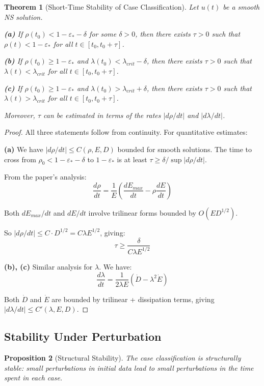 \documentclass[11pt]{article}
\newtheorem{theorem}{Theorem}
\newtheorem{proposition}[theorem]{Proposition}
\theoremstyle{definition}
\begin{document}
\begin{theorem}[Short-Time Stability of Case Classification]\label{thm:short-time}
Let $u(t)$ be a smooth NS solution.

\textbf{(a)} If $\rho(t_0) < 1 - \varepsilon_* - \delta$ for some $\delta > 0$, then there exists $\tau > 0$ such that $\rho(t) < 1 - \varepsilon_*$ for all $t \in [t_0, t_0 + \tau]$.

\textbf{(b)} If $\rho(t_0) \geq 1 - \varepsilon_*$ and $\lambda(t_0) < \lambda_{crit} - \delta$, then there exists $\tau > 0$ such that $\lambda(t) < \lambda_{crit}$ for all $t \in [t_0, t_0 + \tau]$.

\textbf{(c)} If $\rho(t_0) \geq 1 - \varepsilon_*$ and $\lambda(t_0) > \lambda_{crit} + \delta$, then there exists $\tau > 0$ such that $\lambda(t) > \lambda_{crit}$ for all $t \in [t_0, t_0 + \tau]$.

Moreover, $\tau$ can be estimated in terms of the rates $|d\rho/dt|$ and $|d\lambda/dt|$.
\end{theorem}

\begin{proof}
All three statements follow from continuity. For quantitative estimates:

\textbf{(a)} We have $|d\rho/dt| \leq C(\rho, E, D)$ bounded for smooth solutions. The time to cross from $\rho_0 < 1 - \varepsilon_* - \delta$ to $1 - \varepsilon_*$ is at least $\tau \geq \delta / \sup|d\rho/dt|$.

From the paper's analysis:
\[
\frac{d\rho}{dt} = \frac{1}{E}\left(\frac{dE_{max}}{dt} - \rho\frac{dE}{dt}\right)
\]

Both $dE_{max}/dt$ and $dE/dt$ involve trilinear forms bounded by $O(ED^{1/2})$.

So $|d\rho/dt| \leq C \cdot D^{1/2} = C\lambda E^{1/2}$, giving:
\[
\tau \geq \frac{\delta}{C\lambda E^{1/2}}
\]

\textbf{(b), (c)} Similar analysis for $\lambda$. We have:
\[
\frac{d\lambda}{dt} = \frac{1}{2\lambda E}(\dot{D} - \lambda^2 \dot{E})
\]

Both $\dot{D}$ and $\dot{E}$ are bounded by trilinear + dissipation terms, giving $|d\lambda/dt| \leq C'(\lambda, E, D)$.
\end{proof}

\subsection{Stability Under Perturbation}

\begin{proposition}[Structural Stability]
The case classification is structurally stable: small perturbations in initial data lead to small perturbations in the time spent in each case.
\end{proposition}
\end{document}
